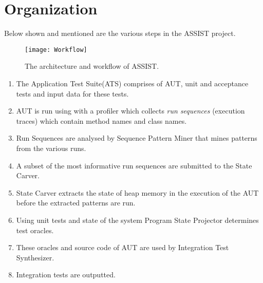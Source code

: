 \section{Organization}
\label{Organization}
Below shown and mentioned are the various steps in the ASSIST project.

\begin{figure}[h]
\centering
 \texttt{[image: Workflow]}
\caption{The architecture and workflow of ASSIST.}
\label{workflow}
\end{figure}

 
\begin{enumerate}
\item The Application Test Suite(ATS) comprises of AUT, unit and acceptance tests and input data for these tests.
\item AUT is run using with a profiler which collects \textit{run sequences} (execution traces) which contain method names and class names.
\item Run Sequences are analysed by Sequence Pattern Miner that mines patterns from the various runs.\label{3}
\item A subset of the most informative run sequences are submitted to the State Carver.\label{4}
\item State Carver extracts the state of heap memory in the execution of the AUT before the extracted patterns are run.
\item Using unit tests and state of the system Program State Projector determines test oracles.
\item These oracles and source code of AUT are used by Integration Test Synthesizer. 
\item Integration tests are outputted.
\end{enumerate}